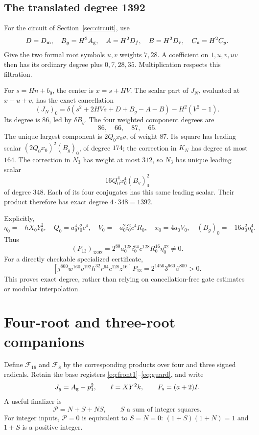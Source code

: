 \documentclass[11pt,a4paper]{article}
\theoremstyle{definition}\newtheorem{definition}[theorem]{Definition}
\theoremstyle{remark}\newtheorem{remark}[theorem]{Remark}
\newcommand{\F}{\mathcal F}\newcommand{\Cal}{\mathcal K}
\newcommand{\Dm}{D_{\rm m}}\newcommand{\Dt}{D_{\tau}}
\newcommand{\Df}{D_f}\newcommand{\Dy}{D_y}\newcommand{\Ag}{A_{\rm g}}
\newcommand{\Cn}{C_{\rm n}}\newcommand{\Rtop}{R_{\rm top}}
\numberwithin{equation}{section}
\begin{document}
\subsection{The translated degree 1392}
For the circuit of Section~\ref{sec:circuit}, use
\[
D=\Dm,\quad B_g=H^2\Ag,\quad
A=H^2\Df,\quad B=H^2\Dt,\quad \Cn=H^2C_y.
\]
Give the two formal root symbols \(u,v\) weights \(7,28\).
A coefficient on \(1,u,v,uv\) then has its ordinary degree plus
\(0,7,28,35\). Multiplication respects this filtration.

For \(s=Hn+b_0\), the center is \(x=s+HV\).
The scalar part of \(J_N\), evaluated at \(x+u+v\), has the exact
cancellation
\[
(J_N)_0=\delta(s^2+2HVs+D+B_g-A-B)-H^2(V^2-1).
\]
Its degree is \(86\), led by \(\delta B_g\).
The four weighted component degrees are
\[
86,\quad66,\quad87,\quad65.
\]
The unique largest component is \(2Q_0x_0v\), of weight \(87\).
Its square has leading scalar \((2Q_0x_0)^2(B_g)_0\), of degree
\(174\); the correction in \(K_N\) has degree at most \(164\).
The correction in \(N_3\) has weight at most \(312\), so \(N_3\)
has unique leading scalar
\[
16Q_0^4x_0^4(B_g)_0^2
\]
of degree \(348\). Each of its four conjugates has this same
leading scalar. Their product therefore has exact degree
\(4\cdot348=1392\).

Explicitly,
\[
\eta_0=-hX_0Y_0^2,\quad
Q_0=a_0^4i_0^2c^4,\quad
V_0=-a_0^2i_0^2c^4R_0,\quad
x_0=4a_0V_0,\quad (B_g)_0=-16a_0^2\eta_0^4.
\]
Thus
\[
(P_{13})_{1392}
=2^{80}a_0^{128}i_0^{64}c^{128}R_0^{16}\eta_0^{32}\ne0.
\]
For a directly checkable specialized certificate,
\[
\left[j^{800}w^{160}v^{192}h^{32}r^{64}c^{128}z^{16}\right]P_{13}
 =2^{1456}3^{960}\beta^{800}>0.
\]
This proves exact degree, rather than relying on cancellation-free
gate estimates or modular interpolation.



\section{Four-root and three-root companions}\label{sec:companions}

Define \(\F_{16}\) and \(\F_8\) by the corresponding products
over four and three signed radicals. Retain the base registers
\eqref{eq:front1}--\eqref{eq:guard}, and write
\[
J_g=\Ag-p_1^2,\qquad
\ell=XY^2k,\qquad F_{\rm s}=(a+2)I.
\]
A useful finalizer is
\[
\mathcal P=N+S+NS,\qquad S\text{ a sum of integer squares}.
\]
For integer inputs, \(\mathcal P=0\) is equivalent to \(S=N=0\):
\((1+S)(1+N)=1\) and \(1+S\) is a positive integer.
\end{document}
